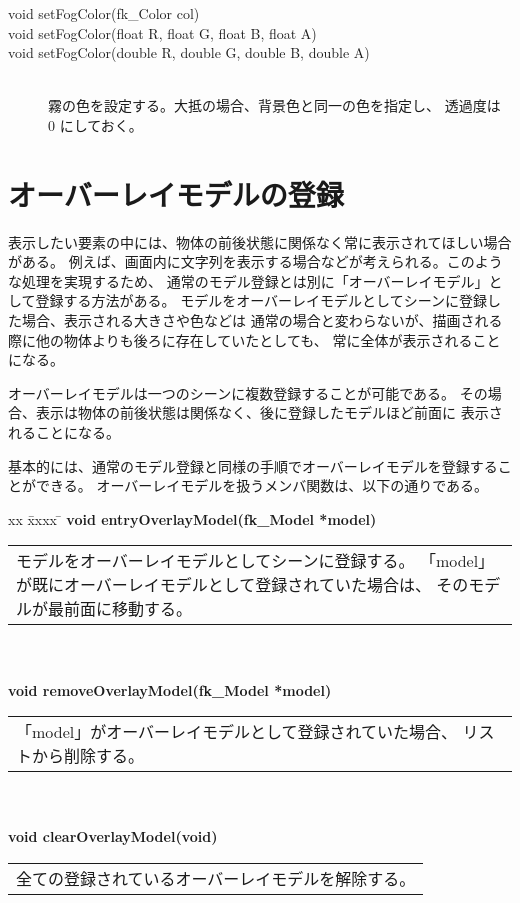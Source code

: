 \begin{description}
 \item[\hspace*{0.6cm}void setFogColor(fk\_Color col)]
 \item[\hspace*{0.6cm}void setFogColor(float R, float G, float B, float A)]
 \item[\hspace*{0.6cm}void setFogColor(double R, double G, double B, double A)]
	~ \\
	霧の色を設定する。大抵の場合、背景色と同一の色を指定し、
	透過度は 0 にしておく。
\end{description}

\section{オーバーレイモデルの登録}

表示したい要素の中には、物体の前後状態に関係なく常に表示されてほしい場合がある。
例えば、画面内に文字列を表示する場合などが考えられる。このような処理を実現するため、
通常のモデル登録とは別に「オーバーレイモデル」として登録する方法がある。
モデルをオーバーレイモデルとしてシーンに登録した場合、表示される大きさや色などは
通常の場合と変わらないが、描画される際に他の物体よりも後ろに存在していたとしても、
常に全体が表示されることになる。

オーバーレイモデルは一つのシーンに複数登録することが可能である。
その場合、表示は物体の前後状態は関係なく、後に登録したモデルほど前面に
表示されることになる。

基本的には、通常のモデル登録と同様の手順でオーバーレイモデルを登録することができる。
オーバーレイモデルを扱うメンバ関数は、以下の通りである。
\begin{tabbing}
xx \= xxxx \= \kill
\> \textbf{void entryOverlayModel(fk\_Model *model)} \\
	\> \> \begin{tabular}{p{15cm}}
		モデルをオーバーレイモデルとしてシーンに登録する。
		「model」が既にオーバーレイモデルとして登録されていた場合は、
		そのモデルが最前面に移動する。
	\end{tabular} \\ \\

\> \textbf{void removeOverlayModel(fk\_Model *model)} \\
	\> \> \begin{tabular}{p{15cm}}
		「model」がオーバーレイモデルとして登録されていた場合、
		リストから削除する。
	\end{tabular} \\ \\

\> \textbf{void clearOverlayModel(void)} \\
	\> \> \begin{tabular}{p{15cm}}
		全ての登録されているオーバーレイモデルを解除する。
	\end{tabular}
\end{tabbing}


